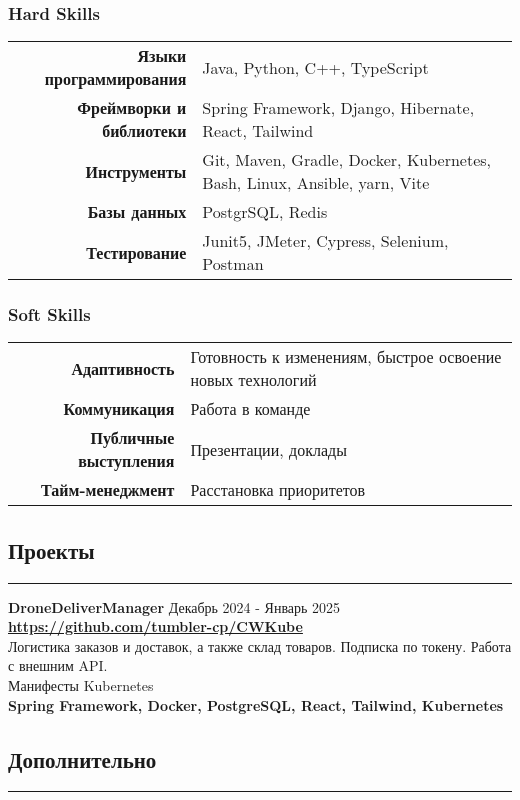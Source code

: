 \documentclass[a4paper,10pt]{article}
\begin{document}
\subsubsection*{Hard Skills}
\vspace*{3mm}
\begin{tabular}{r | l }
    \textbf{Языки программирования} & Java, Python, C++, TypeScript\\
    \textbf{Фреймворки и библиотеки} & Spring Framework, Django, Hibernate, React, Tailwind \\
    \textbf{Инструменты} & Git, Maven, Gradle, Docker, Kubernetes, Bash, Linux, Ansible, yarn, Vite \\
    \textbf{Базы данных} & PostgrSQL, Redis \\
    \textbf{Тестирование} & Junit5, JMeter, Cypress, Selenium, Postman \\
\end{tabular}
\vspace*{3mm}
\subsubsection*{Soft Skills}
\begin{tabular}{r | l}
    \textbf{Адаптивность} & Готовность к изменениям, быстрое освоение новых технологий \\
    \textbf{Коммуникация} & Работа в команде \\
    \textbf{Публичные выступления} & Презентации, доклады \\
    \textbf{Тайм-менеджмент} & Расстановка приоритетов \\
    \end{tabular}
\subsection*{Проекты}
\hrule
\vspace*{3mm}
\textbf{DroneDeliverManager} Декабрь 2024 - Январь 2025\\
\faGithub \hspace*{3mm} \textbf{\url{https://github.com/tumbler-cp/CWKube}} \\
Логистика заказов и доставок, а также склад товаров. Подписка по токену. Работа с внешним API. \\ Манифесты Kubernetes\\
\textbf{Spring Framework, Docker, PostgreSQL, React, Tailwind, Kubernetes} \\

\subsection*{Дополнительно}
\hrule
\vspace*{5mm}
\end{document}

